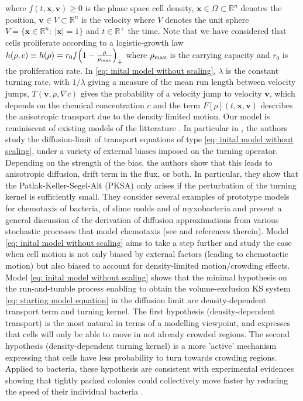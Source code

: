 \documentclass[review,onefignum,onetabnum]{siamart220329}
\begin{document}
\begin{equation}
\end{equation} where $f(t,\mathbf{x},\mathbf{v}) \geq 0$ is the phase space cell density,  $\mathbf{x}\in \Omega \subset \mathbb{R}^n$ denotes the position, $\mathbf{v} \in V \subset \mathbb{R}^n$ is the velocity where $V$ denotes the unit sphere  $V=\{\mathbf{x}\in\mathbb{R}^n:\ |\mathbf{x}|=1 \}$ and $t \in \mathbb{R}^+$ the time. { Note that we have considered that cells proliferate according to a logistic-growth law $h(\rho,c) \equiv h(\rho) =  r_0f\Bigl(1-\frac{\rho}{\rho_{\textnormal{max}}} \Bigr)_+$ where $\rho_{\textnormal{max}}$ is the carrying capacity and $r_0$ is the proliferation rate.} In \eqref{eq: inital model without scaling}, $\lambda$ is the constant turning rate, with $1/\lambda$ giving a measure of the mean run length between velocity jumps, $T(\mathbf{v},\rho,\nabla c)$ gives the probability of a velocity jump to velocity $\mathbf{v}$, which depends on the chemical concentration $c$ and the term $F[\rho](t,\mathbf{x},\mathbf{v})$ describes the anisotropic transport due to the density limited motion. { Our model is reminiscent of existing models of the litterature \cite{othmer2002diffusion,othmer2000diffusion}. In particular in \cite{othmer2002diffusion}, the authors study the diffusion-limit of transport equations of type \eqref{eq: inital model without scaling}, under a variety of external biases imposed on the turning operator. Depending on the strength of the bias, the authors show that this leads to anisotropic diffusion, drift term in the flux, or both. In particular, they show that the Patlak-Keller-Segel-Alt (PKSA) only arises if the perturbation of the turning kernel is sufficiently small. They consider several examples of prototype models for chemotaxis of bacteria, of slime molds and of myxobacteria and present a general discussion of the derivation of diffusion approximations from various stochastic processes that model chemotaxis (see \cite{othmer2000diffusion} and references therein). Model \eqref{eq: inital model without scaling} aims to take a step further and study the case when cell motion is not only biased by external factors (leading to chemotactic motion) but also biased to account for density-limited motion/crowding effects. Model \eqref{eq: inital model without scaling} shows that the minimal hypothesis on the run-and-tumble process enabling to obtain the volume-exclusion KS system \eqref{eq: starting model equation} in the diffusion limit are density-dependent transport term and turning kernel. The first hypothesis (density-dependent transport) is the most natural in terms of a modelling viewpoint, and expresses that cells will only be able to move in not already crowded regions. The second hypothesis (density-dependent turning kernel) is a more 'active' mechanism expressing that cells have less probability to turn towards crowding regions. Applied to bacteria, these hypothesis are consistent with experimental evidences showing that tightly packed colonies could collectively move faster by reducing the speed of their individual bacteria \cite{Meacock2021}.} 
\end{document}
